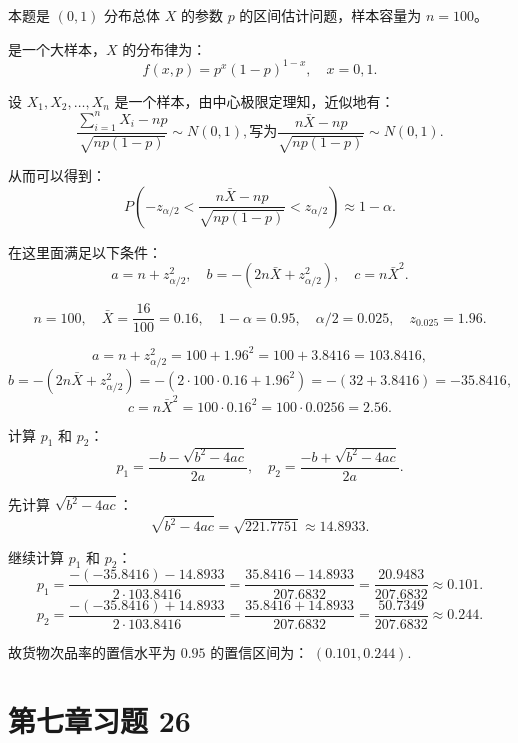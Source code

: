 \documentclass[twoside]{article}
\begin{document}
\begin{ans}{24}{24}

    本题是 $(0,1)$ 分布总体 $X$ 的参数 $p$ 的区间估计问题，样本容量为 $n=100$。
    
    是一个大样本，$X$ 的分布律为：
    \[
    f(x, p) = p^x (1-p)^{1-x}, \quad x = 0, 1.
    \]
    
    设 $X_1, X_2, \ldots, X_n$ 是一个样本，由中心极限定理知，近似地有：
    \[
    \frac{\sum_{i=1}^n X_i - np}{\sqrt{np(1-p)}} \sim N(0, 1), 写为     \frac{n\bar{X} - np}{\sqrt{np(1-p)}} \sim N(0, 1).
    \]
    
    从而可以得到：
    \[
    P\left( -z_{\alpha/2} < \frac{n\bar{X} - np}{\sqrt{np(1-p)}} < z_{\alpha/2} \right) \approx 1 - \alpha.
    \]

    在这里面满足以下条件：
    \[
    a = n + z_{\alpha/2}^2, \quad b = -(2n\bar{X} + z_{\alpha/2}^2), \quad c = n\bar{X}^2.
    \]
    
    \[
    n = 100, \quad \bar{X} = \frac{16}{100} = 0.16, \quad 1-\alpha = 0.95, \quad \alpha/2 = 0.025, \quad z_{0.025} = 1.96.
    \]
    
    \[
    a = n + z_{\alpha/2}^2 = 100 + 1.96^2 = 100 + 3.8416 = 103.8416,
    \]
    \[
    b = -(2n\bar{X} + z_{\alpha/2}^2) = -(2 \cdot 100 \cdot 0.16 + 1.96^2) = -(32 + 3.8416) = -35.8416,
    \]
    \[
    c = n\bar{X}^2 = 100 \cdot 0.16^2 = 100 \cdot 0.0256 = 2.56.
    \]
    
    计算 $p_1$ 和 $p_2$：
    \[
    p_1 = \frac{-b - \sqrt{b^2 - 4ac}}{2a}, \quad p_2 = \frac{-b + \sqrt{b^2 - 4ac}}{2a}.
    \]
    
    先计算 $\sqrt{b^2 - 4ac}$：
    \[
    \sqrt{b^2 - 4ac} = \sqrt{221.7751} \approx 14.8933.
    \]
    
    继续计算 $p_1$ 和 $p_2$：
    \[
    p_1 = \frac{-(-35.8416) - 14.8933}{2 \cdot 103.8416} = \frac{35.8416 - 14.8933}{207.6832} = \frac{20.9483}{207.6832} \approx 0.101.
    \]
    \[
    p_2 = \frac{-(-35.8416) + 14.8933}{2 \cdot 103.8416} = \frac{35.8416 + 14.8933}{207.6832} = \frac{50.7349}{207.6832} \approx 0.244.
    \]
    
    
    故货物次品率的置信水平为 $0.95$ 的置信区间为：
    \(
    (0.101, 0.244).
    \)
    
\end{ans}

\section{第七章习题 26}
\end{document}
